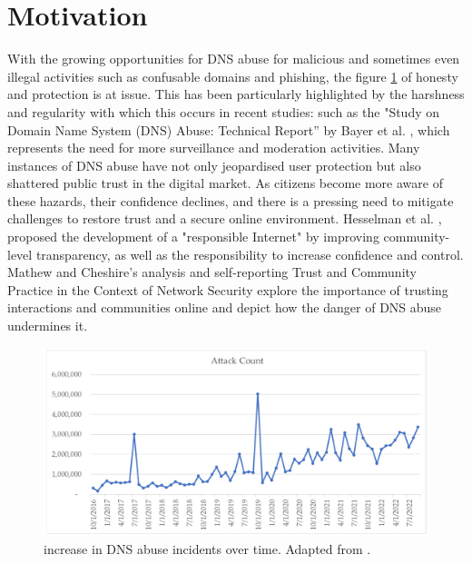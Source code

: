 \section{Motivation}

With the growing opportunities for DNS abuse for malicious and sometimes even illegal activities such as confusable domains and phishing, the figure \ref{fig:dnsintro2} of honesty and protection is at issue. This has been particularly highlighted by the harshness and regularity with which this occurs in recent studies: such as the "Study on Domain Name System (DNS) Abuse: Technical Report” by Bayer et al. \cite{bayer2022}, which represents the need for more surveillance and moderation activities. Many instances of DNS abuse have not only jeopardised user protection but also shattered public trust in the digital market. As citizens become more aware of these hazards, their confidence declines, and there is a pressing need to mitigate challenges to restore trust and a secure online environment. Hesselman et al. \cite{hesselman2020}, proposed the development of a "responsible Internet" by improving community-level transparency, as well as the responsibility to increase confidence and control. Mathew and Cheshire's \cite{mathew2016} analysis and self-reporting Trust and Community Practice in the Context of Network Security explore the importance of trusting interactions and communities online and depict how the danger of DNS abuse undermines it.

\begin{figure}[H]
    \centering
    \includegraphics[width=0.5\linewidth]{introduction/maliciousActivity.png}
    \caption{ increase in DNS abuse incidents over time. Adapted from \cite{Rich2023Cyberpsychology}.}
    \label{fig:dnsintro2}
\end{figure}

